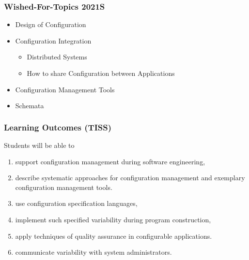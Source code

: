 \begin{frame}
	\frametitle{Wished-For-Topics 2021S}
	\begin{itemize}
	\item Design of Configuration 
	\item Configuration Integration
	\begin{itemize}
	\item Distributed Systems
	\item How to share Configuration between Applications
	\end{itemize}
	\item Configuration Management Tools
	\item Schemata
	\end{itemize}
\end{frame}



\begin{frame}
	\frametitle{Learning Outcomes (TISS)}
	Students will be able to

	\begin{enumerate}
	\item support configuration management during software engineering,
	\item describe systematic approaches for configuration management and exemplary configuration management tools.
	\item use configuration specification languages,
	\item implement such specified variability during program construction,
	\item apply techniques of quality assurance in configurable applications.
	\item communicate variability with system administrators.
	\end{enumerate}
\end{frame}

